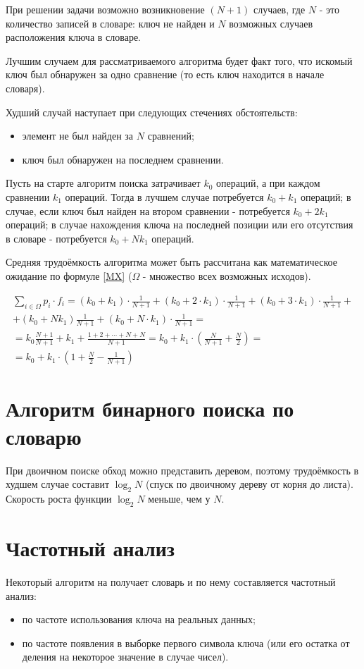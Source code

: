\documentclass[12pt]{report}
\begin{document}
При решении задачи возможно возникновение $(N + 1)$ случаев, где $N$ - это количество записей в словаре: ключ не найден и $N$ возможных случаев расположения ключа в словаре.

Лучшим случаем для рассматриваемого алгоритма будет факт того, что искомый ключ был обнаружен за одно сравнение (то есть ключ находится в начале словаря).

Худший случай наступает при следующих стечениях обстоятельств:
\begin{itemize}
\item элемент не был найден за $N$ сравнений;
\item ключ был обнаружен на последнем сравнении.
\end{itemize}

Пусть на старте алгоритм поиска затрачивает $k_0$ операций, а при каждом сравнении $k_1$ операций. Тогда в лучшем случае потребуется $k_0 + k_1$ операций; в случае, если ключ был найден на втором сравнении - потребуется $k_0 + 2k_1$ операций; в случае нахождения ключа на последней позиции или его отсутствия в словаре - потребуется $k_0 + Nk_1$ операций.

Средняя трудоёмкость алгоритма может быть рассчитана как математическое ожидание по формуле \ref{MX} ($\Omega$ - множество всех возможных исходов).

\label{MX}
\begin{multline}
        \sum\limits_{i \in \Omega} p_i \cdot f_i = (k_0 + k_1) \cdot \frac{1}{N + 1} + (k_0 + 2 \cdot k_1) \cdot \frac{1}{N+1} + (k_0 + 3 \cdot k_1) \cdot \frac{1}{N + 1} + \\+ (k_0 + Nk_1)\frac{1}{N + 1} + (k_0 + N \cdot k_1) \cdot \frac{1}{N + 1} = \\= k_0\frac{N+1}{N+1}+k_1+\frac{1 + 2 + \cdots + N + N}{N + 1} = k_0 + k_1 \cdot \left(\frac{N}{N + 1} + \frac{N}{2}\right) =\\= k_0 + k_1 \cdot \left(1 + \frac{N}{2} - \frac{1}{N + 1}\right)
\end{multline}

\section{Алгоритм бинарного поиска по словарю}
При двоичном поиске обход можно представить деревом, поэтому трудоёмкость в худшем случае составит $\log_2N$ (спуск по двоичному дереву от корня до листа). Скорость роста функции $\log_2N$ меньше, чем у $N$.

\section{Частотный анализ}
Некоторый алгоритм на получает словарь и по нему составляется частотный анализ:
\begin{itemize}
\item по частоте использования ключа на реальных данных;
\item по частоте появления в выборке первого символа ключа (или его остатка от деления на некоторое значение в случае чисел).
\end{itemize}
\end{document}
